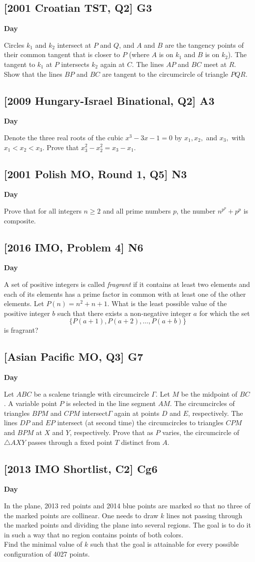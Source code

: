 \documentclass[10pt]{article}
\newcommand{\themonth}{March}
\newcommand{\theyear}{2019}
\newcounter{day}
\newcounter{solution}
\newcounter{datenumber}
\newcommand{\problem}[4][0]{
	\newpage
	\subsection{[#3] \space #2} \hfill 
	{\large\textbf{Day \arabic{day}}} %
	\begin{flushleft} #4 \end{flushleft}
	\vspace{1em}
	\addtocounter{day}{1}
	\addtocounter{datenumber}{1}
	\setcounter{solution}{1}
}
\begin{document}
\problem{G3}{2001 Croatian TST, Q2}{
Circles \(k_1\) and \(k_2\) intersect at \(P\) and \(Q\), and \(A\) and \(B\) are the tangency points of their common tangent that is closer to \(P\) (where \(A\) is on \(k_1\) and \(B\) is on \(k_2\)). The tangent to \(k_1\) at \(P\) intersects \(k_2\) again at \(C\). The lines \(AP\) and \(BC\) meet at \(R\). Show that the lines \(BP\) and \(BC\) are tangent to the circumcircle of triangle \(PQR\).}

\renewcommand{\themonth}{July}
\setcounter{datenumber}{1}

\problem[98]{A3}{2009 Hungary-Israel Binational, Q2}{Denote the three real roots of the cubic \(x^3 - 3x - 1 = 0\) by \(x_1, x_2,\) and \(x_3,\) with \(x_1 < x_2 < x_3\). Prove that \(x_3^2 - x_2^2 = x_3 - x_1.\)}

\problem[99]{N3}{2001 Polish MO, Round 1, Q5}{Prove that for all integers \(n \geq 2\) and all prime numbers \(p\), the number \(n^{p^p} + p^p\) is composite.}

\problem[100]{N6}{2016 IMO, Problem 4}{A set of positive integers is called \textit{fragrant} if it contains at least two elements and each of its elements has a prime factor in common with at least one of the other elements. Let \(P(n) = n^2 + n + 1.\) What is the least possible value of the positive integer \(b\) such that there exists a non-negative integer \(a\) for which the set
	\[\{P\left(a+1\right), P\left(a+2\right), \dots, P\left(a+b\right)\}\]
	is fragrant?}

\problem[101]{G7}{Asian Pacific MO, Q3}{Let \(ABC\) be a scalene triangle with circumcircle $\Gamma{}$. Let \(M\) be the midpoint of \(BC\). A variable point \(P\) is selected in the line segment \(AM\). The circumcircles of triangles $BPM$ and $CPM$ intersect$ \Gamma{}$ again at points $D$ and $E$, respectively. The lines $DP$ and $EP$ intersect (at second time) the circumcircles to triangles $CPM$ and $BPM$ at $X$ and $Y$, respectively. Prove that as $P$ varies, the circumcircle of $\triangle AXY$ passes through a fixed point $T$ distinct from $A$. }

\problem[102]{Cg6}{2013 IMO Shortlist, C2}{In the plane, 2013 red points and 2014 blue points are marked so that no three of the marked points are collinear. One needs to draw \(k\) lines not passing through the marked points and dividing the plane into several regions. The goal is to do it in such a way that no region contains points of both colors.\\
	Find the minimal value of \(k\) such that the goal is attainable for every possible configuration of 4027 points.}
\end{document}
